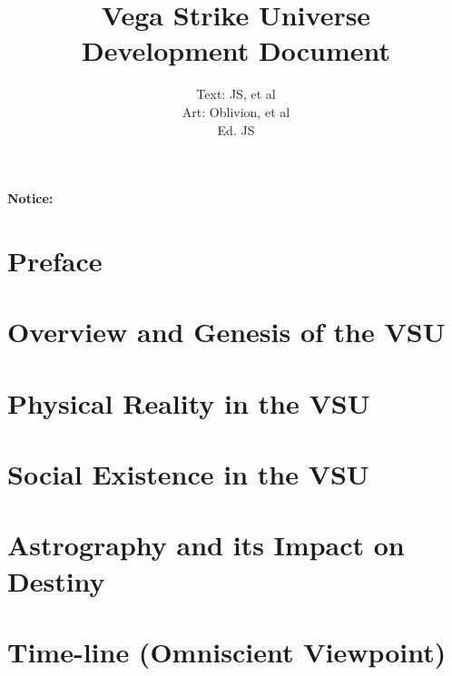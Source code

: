 

\title{Vega Strike Universe \\ 
Development Document}

\author{Text: JS, et al\\
Art: Oblivion, et al \\
Ed. JS}

\renewcommand{\thepage}{\roman{page}}
\maketitle
\renewcommand{\thepage}{\arabic{page}}
\thispagestyle{empty}
\centerline{\bf {\Huge Notice:}}
{\it

}

\setcounter{tocdepth}{2}
\clearpage
{}
{}
\tableofcontents
\listoftables
{}
\listoffigures
{}
\chapter*{Preface}


\chapter{Overview and Genesis of the VSU}


\chapter{Physical Reality in the VSU}


\chapter{Social Existence in the VSU}


\chapter{Astrography and its Impact on Destiny}


\chapter{Time-line (Omniscient Viewpoint)}


